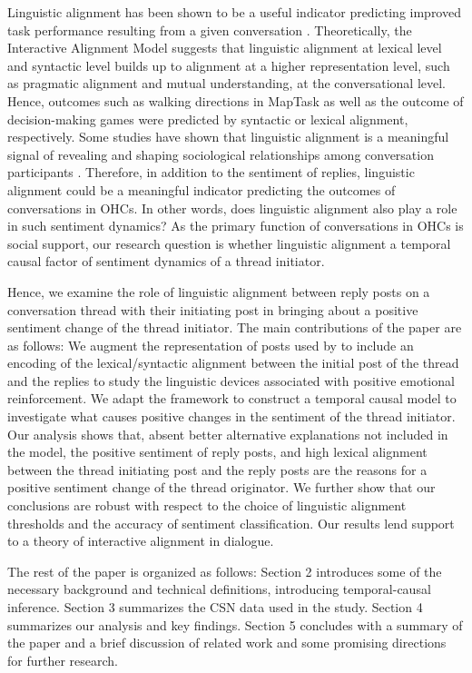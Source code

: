 \documentclass[man,biblatex,floatsintext]{apa6}
\begin{document}
Linguistic alignment has been shown to be a useful indicator predicting improved task performance resulting from a given conversation \parencite{reitter2007predicting}. Theoretically, the Interactive Alignment Model \parencite{pickering2004toward} suggests that linguistic alignment at lexical level and syntactic level builds up to alignment at a higher representation level, such as pragmatic alignment and mutual understanding, at the conversational level. Hence, outcomes such as walking directions in MapTask \parencite{reitter_alignment_2014} as well as the outcome of decision-making games \parencite{fusaroli2012coming} were predicted by syntactic or lexical alignment, respectively. Some studies have shown that linguistic alignment is a meaningful signal of revealing and shaping sociological relationships among conversation participants \parencite{jones2014finding}. Therefore, in addition to the sentiment of replies, linguistic alignment could be a meaningful indicator predicting the outcomes of conversations in OHCs. In other words, does linguistic alignment also play a role in such sentiment dynamics? As the primary function of conversations in OHCs is social support, our research question is whether linguistic alignment a temporal causal factor of sentiment dynamics of a thread initiator.

Hence, we examine the role of linguistic alignment between reply posts on a conversation thread with their initiating post in bringing about a positive sentiment change of the thread initiator. The main contributions of the paper are as follows: We augment the representation of posts used by \textcite{bui2016temporal} to include an encoding of the lexical/syntactic alignment between the initial post of the thread and the replies to study the linguistic devices associated with positive emotional reinforcement. We adapt the framework to construct a temporal causal model to investigate what causes positive changes in the sentiment of the thread initiator. Our analysis shows that, absent better alternative explanations not included in the model, the positive sentiment  of  reply posts,  and  high lexical alignment between the thread initiating post and the reply posts are the reasons for a positive sentiment change of the thread originator. We further show that our conclusions are robust with respect to the choice of linguistic alignment thresholds and the accuracy of sentiment classification. Our results lend support to a theory of interactive alignment in dialogue.

The rest of the paper is organized as follows: Section 2 introduces some of the necessary background and technical definitions, introducing temporal-causal inference. Section 3 summarizes the CSN data used in the study. Section 4 summarizes our analysis and key findings.  Section 5 concludes with a summary of the paper and a brief discussion of related work and some promising directions for further research.
\end{document}
